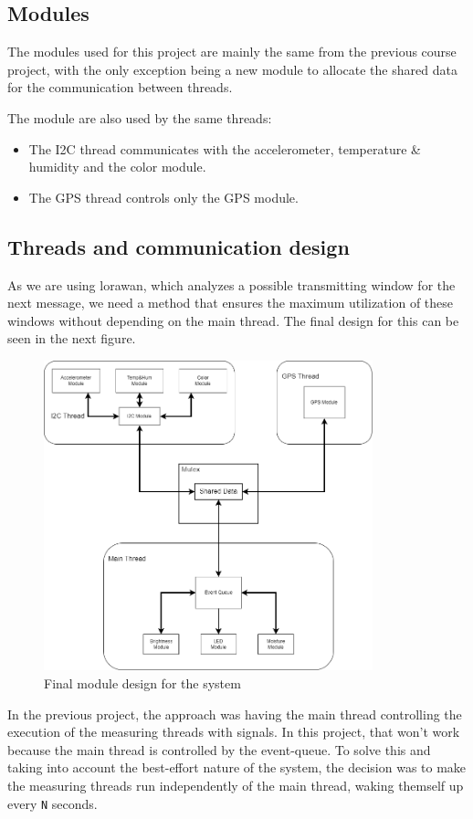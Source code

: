 \subsection{Modules}
The modules used for this project are mainly the same from the previous course project, with the only exception being a new module to allocate the shared data for the communication between threads.

The module are also used by the same threads:
\begin{itemize}
    \item The I2C thread communicates with the accelerometer, temperature \& humidity and the color module.
    \item The GPS thread controls only the GPS module.
\end{itemize}

\clearpage
\subsection{Threads and communication design} %

As we are using \acrshort{lorawan}, which analyzes a possible transmitting window for the next message, we need a method that ensures the maximum utilization of these windows without depending on the main thread. The final design for this can be seen in the next figure.

\begin{figure}[H]
    \centering
    \includegraphics[width=0.85\textwidth]{images/4/Modules.png}
    \caption{Final module design for the system}
    \label{fig:modules}
\end{figure}
In the previous project, the approach was having the main thread controlling the execution of the measuring threads with signals. In this project, that won't work because the main thread is controlled by the event-queue. 
To solve this and taking into account the best-effort nature of the system, the decision was to make the measuring threads run independently of the main thread, waking themself up every \texttt{N} seconds. 


